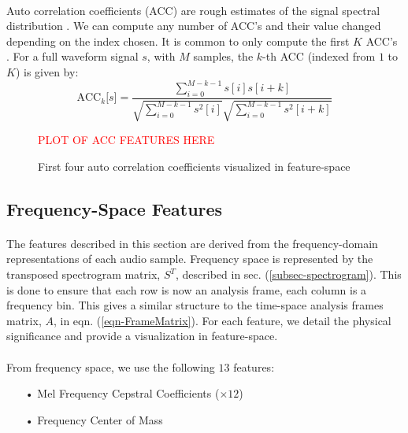 \documentclass[12pt,letterpaper]{article}
\begin{document}
\paragraph*{}Auto correlation coefficients (ACC) are rough estimates of the signal spectral distribution . We can compute any number of ACC's and their value changed depending on the index chosen. It is common to only compute the first $K$ ACC's \cite{Virtanen}. For a full waveform signal $s$, with $M$ samples, the $k$-th ACC (indexed from $1$ to $K$) is given by:
\begin{equation}
\label{eqn-FeatureACC}
\text{ACC}_k\big[ s \big] = 
\frac{\sum_{i=0}^{M-k-1}s[i]s[i+k]} {\sqrt{\sum_{i=0}^{M-k-1}s^2[i]} \sqrt{\sum_{i=0}^{M-k-1}s^2[i+k]}}
\end{equation}

\begin{figure}[H]
\label{fig-FeatureACC}
\begin{center}
\textcolor{red}{PLOT OF ACC FEATURES HERE}
\end{center}
\caption{First four auto correlation coefficients visualized in feature-space}
\end{figure}


\newpage

\subsection{Frequency-Space Features}
\label{subsec-frequency}

\paragraph*{}The features described in this section are derived from the frequency-domain representations of each audio sample. Frequency space is represented by the transposed spectrogram matrix, $S^T$, described in sec. (\ref{subsec-spectrogram}). This is done to ensure that each  row is now an analysis frame, each column is a frequency bin. This gives a similar structure to the time-space analysis frames matrix, $A$, in eqn. (\ref{eqn-FrameMatrix}).
For each feature, we detail the physical significance and provide a visualization in feature-space.

\paragraph*{}From frequency space, we use the following $13$ features:
\begin{itemize}
\item[•] Mel Frequency Cepstral Coefficients ($\times 12$)
\item[•] Frequency Center of Mass
\end{itemize}
\end{document}
